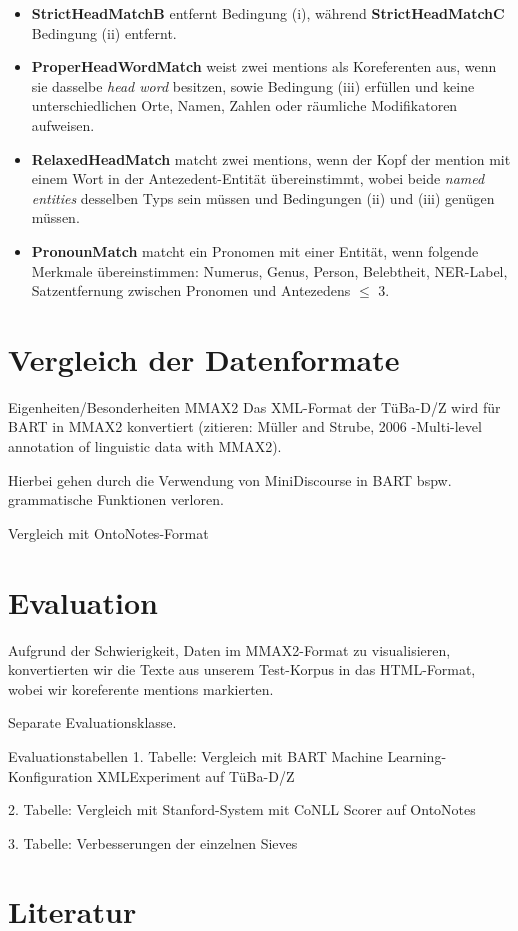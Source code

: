 \documentclass{scrartcl}
\begin{document}
\begin{itemize}
\item \textbf{StrictHeadMatchB} entfernt Bedingung (i), während \textbf{StrictHeadMatchC} Bedingung (ii) entfernt.

\item \textbf{ProperHeadWordMatch} weist zwei mentions als Koreferenten aus, wenn sie dasselbe \textit{head word} besitzen, sowie Bedingung (iii) erfüllen und keine unterschiedlichen Orte, Namen, Zahlen oder räumliche Modifikatoren aufweisen.

\item \textbf{RelaxedHeadMatch} matcht zwei mentions, wenn der Kopf der mention mit einem Wort in der Antezedent-Entität übereinstimmt, wobei beide \textit{named entities} desselben Typs sein müssen und Bedingungen (ii) und (iii) genügen müssen.

\item \textbf{PronounMatch} matcht ein Pronomen mit einer Entität, wenn folgende Merkmale übereinstimmen: Numerus, Genus, Person, Belebtheit, NER-Label, Satzentfernung zwischen Pronomen und Antezedens ${\leq}$ 3.

\end{itemize}

\section{Vergleich der Datenformate}
Eigenheiten/Besonderheiten MMAX2
Das XML-Format der TüBa-D/Z wird für BART in MMAX2 konvertiert (zitieren: Müller and Strube, 2006 -Multi-level annotation of linguistic data with MMAX2).

Hierbei gehen durch die Verwendung von MiniDiscourse in BART bspw. grammatische Funktionen verloren.

Vergleich mit OntoNotes-Format

\section{Evaluation}
Aufgrund der Schwierigkeit, Daten im MMAX2-Format zu visualisieren, konvertierten wir die Texte aus unserem Test-Korpus in das HTML-Format, wobei wir koreferente mentions markierten.

Separate Evaluationsklasse. 

Evaluationstabellen
1. Tabelle: Vergleich mit BART Machine Learning-Konfiguration XMLExperiment auf TüBa-D/Z

2. Tabelle: Vergleich mit Stanford-System mit CoNLL Scorer auf OntoNotes

3. Tabelle: Verbesserungen der einzelnen Sieves

\clearpage

\nocite{*}
\renewcommand*{\refname}{} %
\section{Literatur}  
{}

\end{document}
